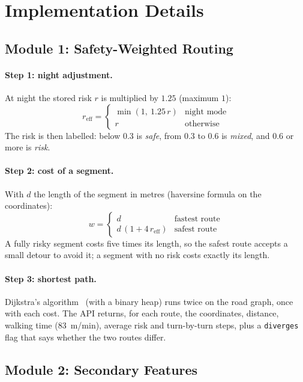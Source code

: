 \documentclass{tietreport}
\begin{document}
\section{Implementation Details}

\subsection{Module 1: Safety-Weighted Routing}

\paragraph{Step 1: night adjustment.} At night the stored risk $r$ is
multiplied by $1.25$ (maximum $1$):
\[
  r_{\mathrm{eff}} =
  \begin{cases}
    \min(1,\ 1.25\,r) & \text{night mode} \\
    r & \text{otherwise}
  \end{cases}
\]
The risk is then labelled: below $0.3$ is \emph{safe}, from $0.3$ to
$0.6$ is \emph{mixed}, and $0.6$ or more is \emph{risk}.

\paragraph{Step 2: cost of a segment.} With $d$ the length of the
segment in metres (haversine formula on the coordinates):
\[
  w =
  \begin{cases}
    d & \text{fastest route} \\
    d\,(1 + 4\,r_{\mathrm{eff}}) & \text{safest route}
  \end{cases}
\]
A fully risky segment costs five times its length, so the safest route
accepts a small detour to avoid it; a segment with no risk costs
exactly its length.

\paragraph{Step 3: shortest path.} Dijkstra's algorithm~\cite{dijkstra1959}
(with a binary heap) runs twice on the road graph, once with each cost.
The API returns, for each route, the coordinates, distance, walking time
(83~m/min), average risk and turn-by-turn steps, plus a
\texttt{diverges} flag that says whether the two routes differ.

\subsection{Module 2: Secondary Features}
\end{document}
